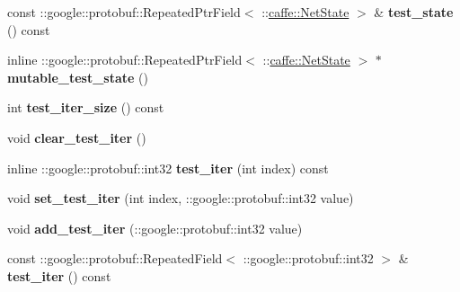 \begin{DoxyCompactItemize}
\item 
\mbox{\label{classcaffe_1_1_solver_parameter_adb17019bfc000cd3785821978a7d0f12}} 
const \+::google\+::protobuf\+::\+Repeated\+Ptr\+Field$<$ \+::\mbox{\hyperlink{classcaffe_1_1_net_state}{caffe\+::\+Net\+State}} $>$ \& {\bfseries test\+\_\+state} () const
\item 
\mbox{\label{classcaffe_1_1_solver_parameter_a33e153962a1a2e952f23d35217ed05df}} 
inline \+::google\+::protobuf\+::\+Repeated\+Ptr\+Field$<$ \+::\mbox{\hyperlink{classcaffe_1_1_net_state}{caffe\+::\+Net\+State}} $>$ $\ast$ {\bfseries mutable\+\_\+test\+\_\+state} ()
\item 
\mbox{\label{classcaffe_1_1_solver_parameter_a12a5e73ff92fc5037d23e0f91d20a3a0}} 
int {\bfseries test\+\_\+iter\+\_\+size} () const
\item 
\mbox{\label{classcaffe_1_1_solver_parameter_a55d1481c6fd383ea3d19fb10d8e61fe7}} 
void {\bfseries clear\+\_\+test\+\_\+iter} ()
\item 
\mbox{\label{classcaffe_1_1_solver_parameter_af86bb96c530892b6b18b31dd2e4de412}} 
inline \+::google\+::protobuf\+::int32 {\bfseries test\+\_\+iter} (int index) const
\item 
\mbox{\label{classcaffe_1_1_solver_parameter_a317a0065a016b7a9e7ba5c776227e737}} 
void {\bfseries set\+\_\+test\+\_\+iter} (int index, \+::google\+::protobuf\+::int32 value)
\item 
\mbox{\label{classcaffe_1_1_solver_parameter_a5051dc16feb74c68ed47579e0853e996}} 
void {\bfseries add\+\_\+test\+\_\+iter} (\+::google\+::protobuf\+::int32 value)
\item 
\mbox{\label{classcaffe_1_1_solver_parameter_a5a530ae118e2ea2d3fc81c377b4ba563}} 
const \+::google\+::protobuf\+::\+Repeated\+Field$<$ \+::google\+::protobuf\+::int32 $>$ \& {\bfseries test\+\_\+iter} () const
\item 
\mbox{\label{classcaffe_1_1_solver_parameter_a0bdd5184bc15967d1e3c36f476dae311}} 

\end{DoxyCompactItemize}
